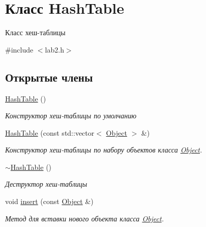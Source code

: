 \hypertarget{classHashTable}{}\section{Класс Hash\+Table}
\label{classHashTable}


Класс хеш-\/таблицы  




{\ttfamily \#include $<$lab2.\+h$>$}

\subsection*{Открытые члены}
\begin{DoxyCompactItemize}
\item 
\mbox{\label{classHashTable_adc3bf2b214c572819ba957ad314d7db3}} 
\mbox{\hyperlink{classHashTable_adc3bf2b214c572819ba957ad314d7db3}{Hash\+Table}} ()
\begin{DoxyCompactList}\small\item\em Конструктор хеш-\/таблицы по умолчанию \end{DoxyCompactList}\item 
\mbox{\hyperlink{classHashTable_a76dc30591ccc0f44104f9d42cb342271}{Hash\+Table}} (const std\+::vector$<$ \mbox{\hyperlink{structObject}{Object}} $>$ \&)
\begin{DoxyCompactList}\small\item\em Конструктор хеш-\/таблицы по набору объектов класса \mbox{\hyperlink{structObject}{Object}}. \end{DoxyCompactList}\item 
\mbox{\label{classHashTable_a9ce5569bb945880cacb29aaba6f3e3f9}} 
\mbox{\hyperlink{classHashTable_a9ce5569bb945880cacb29aaba6f3e3f9}{$\sim$\+Hash\+Table}} ()
\begin{DoxyCompactList}\small\item\em Деструктор хеш-\/таблицы \end{DoxyCompactList}\item 
void \mbox{\hyperlink{classHashTable_a59ca87e22b811a05fa83b7dd9d8b94a1}{insert}} (const \mbox{\hyperlink{structObject}{Object}} \&)
\begin{DoxyCompactList}\small\item\em Метод для вставки нового объекта класса \mbox{\hyperlink{structObject}{Object}}. \end{DoxyCompactList}\item 

\end{DoxyCompactItemize}
